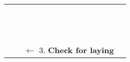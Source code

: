 \begin{table}[H]
\begin{center}
\begin{tabular}{>{\stepcounter{rowno}\therowno}lllcc}
\\ \\  \\  \\  \\  \\  \\  \\  \\  \\  \\  \\  \\  \\ 
 & & \multicolumn{2}{l}{$\leftarrow$  3. \textbf{Check for laying}}
\end{tabular}
\end{center}
\end{table}